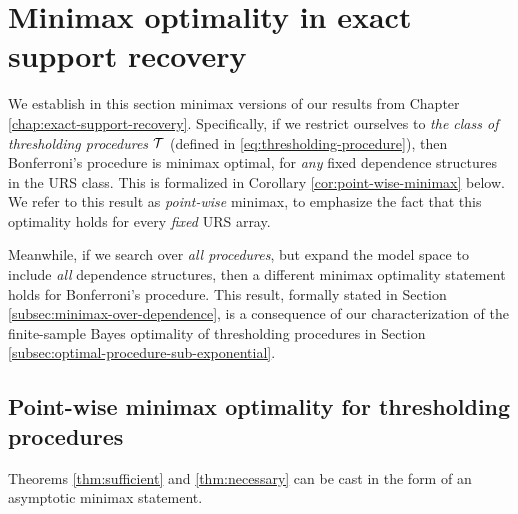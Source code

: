 \section{Minimax optimality in exact support recovery}

We establish in this section minimax versions of our results from Chapter \ref{chap:exact-support-recovery}.
Specifically, if we restrict ourselves to \emph{the class of thresholding procedures} $\cal T$ (defined in \eqref{eq:thresholding-procedure}), then Bonferroni's procedure is minimax optimal, for \emph{any} fixed dependence structures in the URS class.
This is formalized in Corollary \ref{cor:point-wise-minimax} below.%
We refer to this result as \emph{point-wise} minimax, to emphasize the fact that this optimality holds for every \emph{fixed} URS array.

Meanwhile, if we search over \emph{all procedures}, but expand the model space to include {\em all} dependence 
structures, then a different minimax optimality statement holds for Bonferroni's procedure.
This result, formally stated in Section \ref{subsec:minimax-over-dependence}, is a consequence of our characterization 
of the finite-sample Bayes optimality of thresholding procedures in Section \ref{subsec:optimal-procedure-sub-exponential}.


\subsection{Point-wise minimax optimality for thresholding procedures}
\label{subsec:point-wise-minimax}

Theorems \ref{thm:sufficient} and \ref{thm:necessary} can be cast in the form of an asymptotic minimax statement. 

